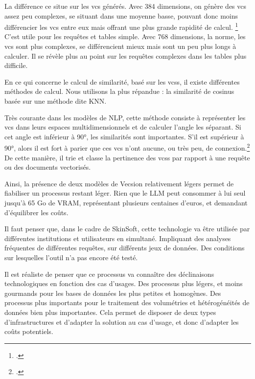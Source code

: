La différence ce situe sur les \gls{vcs} générés. Avec 384 dimensions, on génère des \gls{vcs} assez peu complexes, se situant dans une moyenne basse, pouvant donc moins différencier les \gls{vcs} entre eux mais offrant une plus grande rapidité de calcul. \footcite{wangMultilingualE5Text2024} C'est utile pour les requêtes et \glspl{table} simple. Avec 768 dimensions, la norme, les \gls{vcs} sont plus complexes, se différencient mieux mais sont un peu plus longs à calculer. Il se révèle plus au point sur les requêtes complexes dans les \glspl{table} plus difficile.

En ce qui concerne le calcul de similarité, basé sur les \glspl{vcs}, il existe différentes méthodes de calcul. Nous utilisons la plus répandue : la similarité de cosinus basée sur une méthode dite KNN. 

Très courante dans les modèles de \gls{NLP}, cette méthode consiste à représenter les \gls{vcs} dans leurs espaces multidimensionnels et de calculer l'angle les séparant. Si cet angle est inférieur à 90°, les similarités sont importantes. S'il est supérieur à 90°, alors il est fort à parier que ces \gls{vcs} n'ont aucune, ou très peu, de connexion.\footcite{QuestceQueLalgorithme} De cette manière, il trie et classe la pertinence des \glspl{vcs} par rapport à une requête ou des documents vectorisés.\newline

Ainsi, la présence de deux modèles de \gls{Vecsion} relativement légers permet de fiabiliser un processus restant léger. Rien que le \gls{LLM} peut consommer à lui seul jusqu'à 65 Go de \gls{VRAM}, représentant plusieurs centaines d'euros, et demandant d'équilibrer les coûts.\newline

Il faut penser que, dans le cadre de SkinSoft, cette technologie va être utilisée par différentes institutions et utilisateurs en simultané. Impliquant des analyses fréquentes de différentes requêtes, sur différents jeux de données. Des conditions sur lesquelles l'outil n'a pas encore été testé. 

Il est réaliste de penser que ce processus va connaître des déclinaisons technologiques en fonction des cas d'usages. Des processus plus légers, et moins gourmands pour les bases de données les plus petites et homogènes. Des processus plus importants pour le traitement des volumétries et hétérogénéités de données bien plus importantes. Cela permet de disposer de deux types d'infrastructures et d'adapter la solution au cas d'usage, et donc d'adapter les coûts potentiels.

